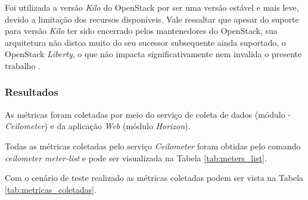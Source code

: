 \documentclass[conference]{IEEEtran}
\begin{document}
	Foi utilizada a versão \textit{Kilo} \cite{openstack_kilo} do OpenStack por ser uma versão estável e mais leve, devido a
	limitação dos recursos disponíveis.
	Vale ressaltar que apesar do suporte para versão \textit{Kilo} ter sido encerrado pelos mantenedores do OpenStack,
	sua arquitetura não distoa muito do seu sucessor subsequente ainda suportado, o OpenStack \textit{Liberty}, o que
	não impacta significativamente nem invalida o presente trabalho \cite{openstack_liberty}.

		    
    \subsubsection{Resultados} \label{resultados_levantamento}
  
	As métricas foram coletadas por meio do serviço de coleta de dados (módulo - \textit{Ceilometer}) e 
	da aplicação \textit{Web} (módulo \textit{Horizon}). 
	
	Todas as métricas coletadas pelo serviço \textit{Ceilometer} foram obtidas pelo comando \textit{ceilometer meter-list} e
	pode ser visualizada na Tabela \ref{tab:meters_list}.
	
	
	Com o cenário de teste realizado as métricas coletadas podem ser vista na Tabela \ref{tab:metricas_coletadas}.
	
\end{document}
